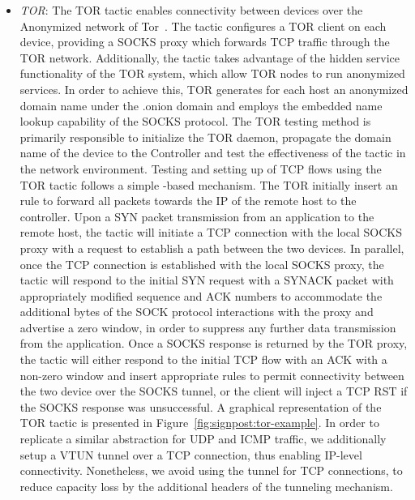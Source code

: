 \begin{itemize}
  \item \emph{TOR}: The TOR tactic enables connectivity between devices over the
    Anonymized network of Tor~\cite{dingledine2006}. The tactic configures a TOR
    client on each device, providing a SOCKS proxy which forwards TCP traffic
    through the TOR network.  Additionally, the tactic takes advantage of the
    hidden service functionality of the TOR system, which allow TOR nodes to run
    anonymized services. In order to achieve this, TOR generates for each host
    an anonymized domain name under the .onion domain and employs the embedded
    name lookup capability of the SOCKS protocol. The TOR testing method is 
    primarily responsible to initialize the TOR daemon, propagate the
    domain name of the device to the Controller and test the effectiveness of
    the tactic in the network environment.  Testing and setting up of TCP flows
    using the TOR tactic follows a simple \of-based mechanism. The TOR
    initially insert an \of rule to forward all packets towards the
    \signpost IP of the remote host to the controller. Upon a SYN packet
    transmission from an application to the remote \signpost host, the tactic
    will initiate a TCP connection with the local SOCKS proxy with a request to
    establish a path between the two devices. In parallel, once the TCP
    connection is established with the local SOCKS proxy, the tactic will
    respond to the initial SYN request with a SYNACK packet with appropriately
    modified sequence and ACK numbers to accommodate the additional bytes of the
    SOCK protocol interactions with the proxy and advertise a zero
    window, in order to suppress any further data transmission from the
    application.  Once a SOCKS response is returned by the TOR proxy, the tactic
    will either respond to the initial TCP flow with an ACK with a non-zero
    window and insert appropriate \of rules to permit connectivity between the
    two device over the SOCKS tunnel, or the client will inject a TCP RST if the
    SOCKS response was unsuccessful. A graphical representation of the TOR
    tactic is presented in Figure~\ref{fig:signpost:tor-example}. 
      In order to replicate a similar abstraction
    for UDP and ICMP traffic, we additionally setup a VTUN tunnel over a TCP
    connection, thus enabling IP-level connectivity. Nonetheless, we avoid using
    the tunnel for TCP connections, to reduce capacity loss by the additional
    headers of the tunneling mechanism. 


\end{itemize}
